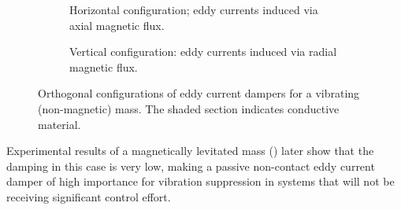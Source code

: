 \begin{figure}
  \begin{subfigure}
    \caption{Horizontal configuration; eddy
      currents induced via axial magnetic
      flux.}
  \end{subfigure}
  \begin{subfigure}
    \caption{Vertical configuration: eddy
       currents induced via radial magnetic
       flux.}
  \end{subfigure}
  \caption{Orthogonal configurations of eddy current dampers for a vibrating
    (non-magnetic) mass. The shaded section indicates conductive material.}
\end{figure}

Experimental results of a magnetically levitated mass
() later show that the damping in this case is very
low, making a passive non-contact eddy current damper of high
importance for vibration suppression in systems that will not be
receiving significant control effort.




